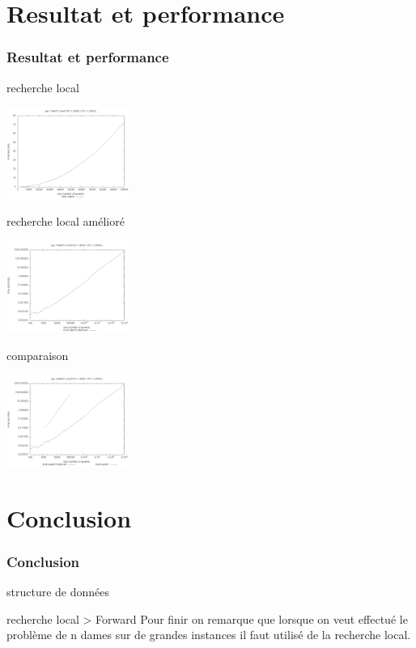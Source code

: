 \documentclass[10pt,a4paper]{beamer}
\begin{document}
\section{Resultat et performance}
\begin{frame}
	\frametitle{Resultat et performance}

	\begin{block}{recherche local}

	\includegraphics[width=0.3\textwidth]{images/plot_ls_i7.png}

	\end{block}

	\begin{block}{recherche local amélioré}

	\includegraphics[width=0.3\textwidth]{images/plot_lst_i7.png}

	\end{block}

	\begin{block}{comparaison}

	\includegraphics[width=0.3\textwidth]{images/plot_lst_ls_i7.png}

	\end{block}



\end{frame}

\section{Conclusion}
\begin{frame}
	\frametitle{Conclusion}

	\begin{block}{structure de données}


	\end{block}

	\begin{block}{recherche local > Forward}
		Pour finir on remarque que lorsque on veut effectué le problème de n dames sur de grandes instances il faut utilisé de la recherche local.
	\end{block}


\end{frame}
\end{document}
